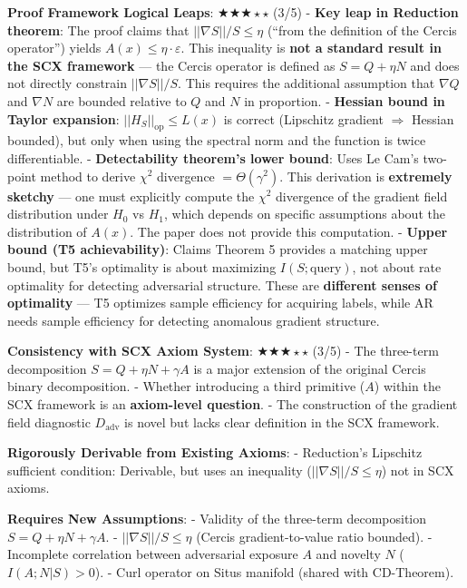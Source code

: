 \documentclass[
  12pt,
]{article}
\begin{document}
\textbf{Proof Framework Logical Leaps}: $\bigstar\bigstar\bigstar{\scriptstyle\star}{\scriptstyle\star}$ (3/5)
- \textbf{Key leap in Reduction theorem}: The proof claims that $||\nabla S||/S \leq \eta$ (``from the definition of the Cercis operator'') yields $A(x) \leq \eta\cdot\varepsilon$. This inequality is \textbf{not a standard result in the SCX framework} --- the Cercis operator is defined as $S=Q+\eta N$ and does not directly constrain $||\nabla S||/S$. This requires the additional assumption that $\nabla Q$ and $\nabla N$ are bounded relative to $Q$ and $N$ in proportion.
- \textbf{Hessian bound in Taylor expansion}: $||H_S||_{\text{op}} \leq L(x)$ is correct (Lipschitz gradient $\Rightarrow$ Hessian bounded), but only when using the spectral norm and the function is twice differentiable.
- \textbf{Detectability theorem's lower bound}: Uses Le Cam's two-point method to derive $\chi^2$ divergence $= \Theta(\gamma^2)$. This derivation is \textbf{extremely sketchy} --- one must explicitly compute the $\chi^2$ divergence of the gradient field distribution under $H_0$ vs $H_1$, which depends on specific assumptions about the distribution of $A(x)$. The paper does not provide this computation.
- \textbf{Upper bound (T5 achievability)}: Claims Theorem 5 provides a matching upper bound, but T5's optimality is about maximizing $I(S;\text{query})$, not about rate optimality for detecting adversarial structure. These are \textbf{different senses of optimality} --- T5 optimizes sample efficiency for acquiring labels, while AR needs sample efficiency for detecting anomalous gradient structure.

\textbf{Consistency with SCX Axiom System}: $\bigstar\bigstar\bigstar{\scriptstyle\star}{\scriptstyle\star}$ (3/5)
- The three-term decomposition $S=Q+\eta N+\gamma A$ is a major extension of the original Cercis binary decomposition.
- Whether introducing a third primitive ($A$) within the SCX framework is an \textbf{axiom-level question}.
- The construction of the gradient field diagnostic $D_{\text{adv}}$ is novel but lacks clear definition in the SCX framework.

\textbf{Rigorously Derivable from Existing Axioms}:
- Reduction's Lipschitz sufficient condition: Derivable, but uses an inequality ($||\nabla S||/S \leq \eta$) not in SCX axioms.

\textbf{Requires New Assumptions}:
- Validity of the three-term decomposition $S=Q+\eta N+\gamma A$.
- $||\nabla S||/S \leq \eta$ (Cercis gradient-to-value ratio bounded).
- Incomplete correlation between adversarial exposure $A$ and novelty $N$ ($I(A;N|S)>0$).
- Curl operator on Situs manifold (shared with CD-Theorem).
\end{document}
